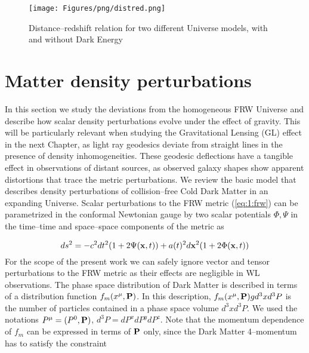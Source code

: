 \begin{figure}
\begin{center}
\texttt{[image: Figures/png/distred.png]}
\end{center}
\caption{Distance--redshift relation for two different Universe models, with and without Dark Energy}
\label{fig:1:distred}
\end{figure}    


\section{Matter density perturbations}
\label{sec:1:density-pert}
In this section we study the deviations from the homogeneous FRW Universe and describe how scalar density perturbations evolve under the effect of gravity. This will be particularly relevant when studying the Gravitational Lensing (GL) effect in the next Chapter, as light ray geodesics deviate from straight lines in the presence of density inhomogeneities. These geodesic deflections have a tangible effect in observations of distant sources, as observed galaxy shapes show apparent distortions that trace the metric perturbations. We review the basic model that describes density perturbations of collision--free Cold Dark Matter in an expanding Universe. Scalar perturbations to the FRW metric (\ref{eq:1:frw}) can be parametrized in the conformal Newtonian gauge \citep{Dodelson-C4} by two scalar potentials $\Phi,\Psi$ in the time--time and space--space components of the metric as 

\begin{equation}
\label{eq:1:confnewt}
ds^2 = -c^2dt^2(1+2\Psi(\mathbf{x},t)) + a(t)^2d\mathbf{x}^2(1+2\Phi(\mathbf{x},t))
\end{equation}
%
For the scope of the present work we can safely ignore vector and tensor perturbations to the FRW metric as their effects are negligible in WL observations. The phase space distribution of Dark Matter is described in terms of a distribution function $f_m(x^\mu,\mathbf{P})$. In this description, $f_m(x^\mu,\mathbf{P})g d^3x d^3P$ is the number of particles contained in a phase space volume $d^3x d^3P$. We used the notations $P^\mu=(P^0,\mathbf{P})$, $d^3 P = dP^x dP^y dP^z$. Note that the momentum dependence of $f_m$ can be expressed in terms of $\mathbf{P}$ only, since the Dark Matter 4--momentum has to satisfy the constraint

